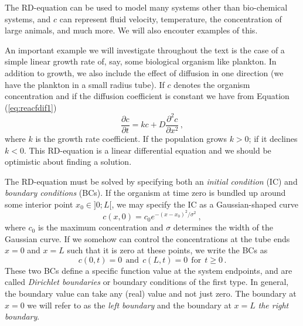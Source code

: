The RD-equation can be used to model many systems other than bio-chemical systems, and $c$ can
represent fluid velocity, temperature, the concentration of large animals, and much more. We will
also encouter examples of this. 

\begin{example}
	\label{ex:simplegrowth}
	An important example we will investigate throughout the text is the case of 
	a simple linear growth rate of, say, some biological organism like plankton. 
	In addition to growth, we also include the effect of diffusion in one direction 
	(we have the plankton in a small radius tube). If $c$ denotes the 
	organism concentration and if the diffusion coefficient is constant we have from
	Equation (\ref{eq:reacfdif1})
	\begin{equation}
		\label{eq:linrd}
		\frac{\partial c}{\partial t} = kc + D \frac{\partial^2 c}{\partial x^2} \, ,
	\end{equation}
	where $k$ is the growth rate coefficient. If the population grows $k>0$; if it
	declines $k<0$. This RD-equation is a linear differential equation and
	we should be optimistic about finding a solution.

	The RD-equation must be solved by specifying both an \emph{initial condition}  (IC) and
	\emph{boundary conditions}  (BCs). If the organism at time zero is
	bundled up around some	interior point $x_0 \in ]0;L[$, we may specify the IC as a Gaussian-shaped curve 
	\begin{equation}
		c(x,0)=c_0 e^{-(x-x_0)^2/\sigma^2} \ ,
	\end{equation}
	where $c_0$ is the maximum concentration and $\sigma$ determines the width of
	the Gaussian curve. If we somehow can control the concentrations at the tube
	ends $x=0$ and $x=L$ such that it is zero at these points, we write the BCs as
	\begin{equation}
		\label{eq:bcDiriclecht}
		c(0, t) = 0 \ \ \text{and} \ \ c(L,t) = 0 \ \ \text{for} \ \ t \geq 0 \, . 
	\end{equation}
	These two BCs define a specific function value at the system endpoints, and
	are called \emph{Dirichlet boundaries}  or boundary conditions of the first
	type. In general, the
	boundary value can take any (real) value and not just zero. The boundary at $x=0$ we 
	will refer to as the \emph{left boundary} and the boundary at $x=L$ 
	\emph{the right boundary}. 


\end{example}
